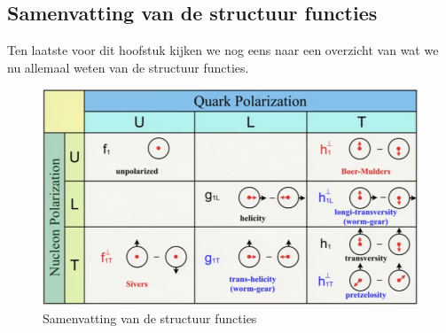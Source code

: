\documentclass[../main.tex]{subfiles}
\begin{document}
\subsection{Samenvatting van de structuur functies}%
\label{sub:samenvatting_van_de_structuur_functies}

Ten laatste voor dit hoofstuk kijken we nog eens naar een overzicht van wat we nu allemaal weten van de structuur functies.

\begin{figure}[h]
    \centering
    \includegraphics[width=0.8\linewidth]{DIS_nucleon_structuur_pdf/struct_func_samenvatting.png}
    \caption{Samenvatting van de structuur functies}%
    \label{fig:struct_func_samenvatting}
\end{figure}
\end{document}
